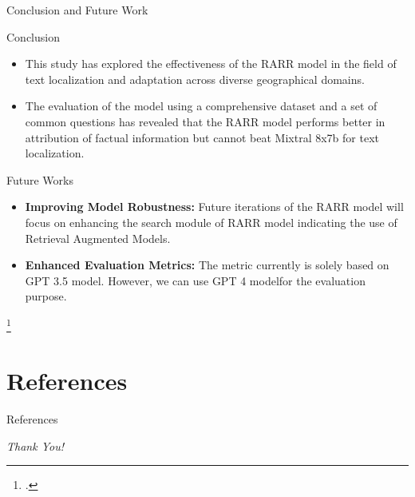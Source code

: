 \documentclass{beamer}
\begin{document}
	\begin{frame}{Conclusion and Future Work}
		\begin{block}{\scriptsize Conclusion}\scriptsize
			\begin{itemize}
				\item This study has explored the effectiveness of the RARR model in the field of text localization and adaptation across diverse geographical domains. 
				\item The evaluation of the model using a comprehensive dataset and a set of common questions has revealed that the RARR model performs better in attribution of factual information but cannot beat Mixtral 8x7b for text localization.
			\end{itemize}
		\end{block}
		\begin{block}{\scriptsize Future Works}\scriptsize
			\begin{itemize}
				\item \textbf{Improving Model Robustness:} Future iterations of the RARR model will focus on enhancing the search module of RARR model indicating the use of Retrieval Augmented Models.
				
				\item \textbf{Enhanced Evaluation Metrics:} The metric currently is solely based on GPT 3.5 model. However, we can use GPT 4 model\footnotemark for the evaluation purpose.
			\end{itemize}
		\end{block}\footcitetext{openai2024gpt4}
	\end{frame}
	
	\section{References}
	\begin{frame}{References}
		\begin{block}{}\scriptsize
			\printbibliography
		\end{block}
	\end{frame}
	
	\begin{frame}{}
		\centering \Huge
		\emph{Thank You!}
	\end{frame}
	
\end{document}
